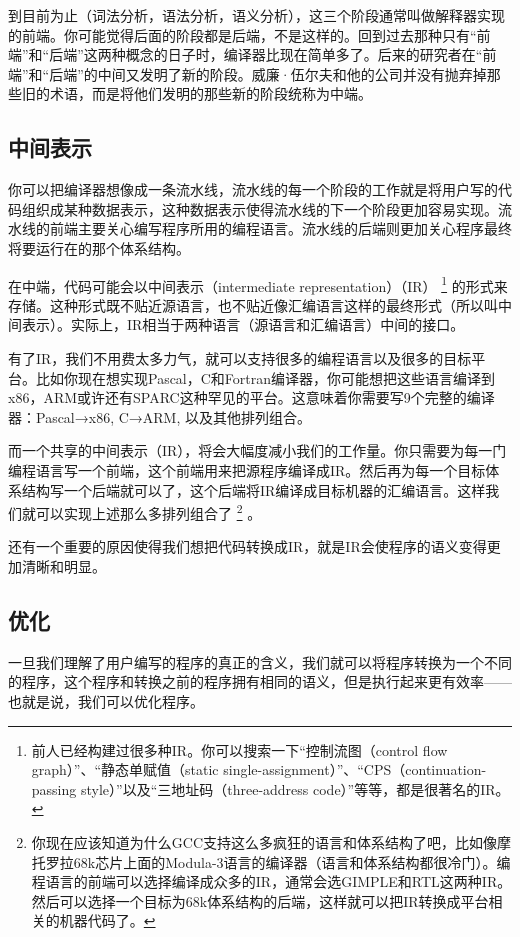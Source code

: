 \documentclass[cn,10pt,math=newtx,citestyle=gb7714-2015,bibstyle=gb7714-2015]{elegantbook}
\begin{document}
到目前为止（词法分析，语法分析，语义分析），这三个阶段通常叫做解释器实现的前端。你可能觉得后面的阶段都是后端，不是这样的。回到过去那种只有“前端”和“后端”这两种概念的日子时，编译器比现在简单多了。后来的研究者在“前端”和“后端”的中间又发明了新的阶段。威廉·伍尔夫和他的公司并没有抛弃掉那些旧的术语，而是将他们发明的那些新的阶段统称为中端。

\subsection{中间表示}

你可以把编译器想像成一条流水线，流水线的每一个阶段的工作就是将用户写的代码组织成某种数据表示，这种数据表示使得流水线的下一个阶段更加容易实现。流水线的前端主要关心编写程序所用的编程语言。流水线的后端则更加关心程序最终将要运行在的那个体系结构。

在中端，代码可能会以中间表示（intermediate representation）（IR） \footnote{前人已经构建过很多种IR。你可以搜索一下“控制流图（control flow graph）”、“静态单赋值（static single-assignment）”、“CPS（continuation-passing style）”以及“三地址码（three-address code）”等等，都是很著名的IR。} 的形式来存储。这种形式既不贴近源语言，也不贴近像汇编语言这样的最终形式（所以叫中间表示）。实际上，IR相当于两种语言（源语言和汇编语言）中间的接口。

有了IR，我们不用费太多力气，就可以支持很多的编程语言以及很多的目标平台。比如你现在想实现Pascal，C和Fortran编译器，你可能想把这些语言编译到x86，ARM或许还有SPARC这种罕见的平台。这意味着你需要写9个完整的编译器：Pascal→x86, C→ARM, 以及其他排列组合。

而一个共享的中间表示（IR），将会大幅度减小我们的工作量。你只需要为每一门编程语言写一个前端，这个前端用来把源程序编译成IR。然后再为每一个目标体系结构写一个后端就可以了，这个后端将IR编译成目标机器的汇编语言。这样我们就可以实现上述那么多排列组合了 \footnote{你现在应该知道为什么GCC支持这么多疯狂的语言和体系结构了吧，比如像摩托罗拉68k芯片上面的Modula-3语言的编译器（语言和体系结构都很冷门）。编程语言的前端可以选择编译成众多的IR，通常会选GIMPLE和RTL这两种IR。然后可以选择一个目标为68k体系结构的后端，这样就可以把IR转换成平台相关的机器代码了。} 。

还有一个重要的原因使得我们想把代码转换成IR，就是IR会使程序的语义变得更加清晰和明显。

\subsection{优化}

一旦我们理解了用户编写的程序的真正的含义，我们就可以将程序转换为一个不同的程序，这个程序和转换之前的程序拥有相同的语义，但是执行起来更有效率——也就是说，我们可以优化程序。
\end{document}
